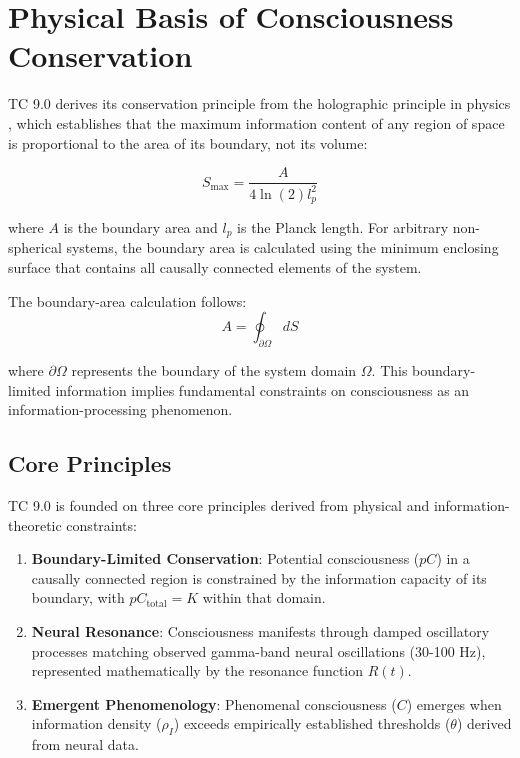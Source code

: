 \documentclass[12pt]{article}
\begin{document}
\section{Physical Basis of Consciousness Conservation}

TC 9.0 derives its conservation principle from the holographic principle in physics \cite{susskind1995,bousso2002}, which establishes that the maximum information content of any region of space is proportional to the area of its boundary, not its volume:

\begin{equation}
S_{\text{max}} = \frac{A}{4\ln(2)l_p^2}
\end{equation}

where $A$ is the boundary area and $l_p$ is the Planck length. For arbitrary non-spherical systems, the boundary area is calculated using the minimum enclosing surface that contains all causally connected elements of the system.

The boundary-area calculation follows:
\begin{equation}
A = \oint_{\partial \Omega} dS
\end{equation}

where $\partial \Omega$ represents the boundary of the system domain $\Omega$. This boundary-limited information implies fundamental constraints on consciousness as an information-processing phenomenon.

\subsection{Core Principles}
TC 9.0 is founded on three core principles derived from physical and information-theoretic constraints:

\begin{enumerate}
    \item \textbf{Boundary-Limited Conservation}: Potential consciousness ($pC$) in a causally connected region is constrained by the information capacity of its boundary, with $pC_{\text{total}} = K$ within that domain.
    
    \item \textbf{Neural Resonance}: Consciousness manifests through damped oscillatory processes matching observed gamma-band neural oscillations (30-100 Hz), represented mathematically by the resonance function $R(t)$.
    
    \item \textbf{Emergent Phenomenology}: Phenomenal consciousness ($C$) emerges when information density ($\rho_I$) exceeds empirically established thresholds ($\theta$) derived from neural data.
\end{enumerate}
\end{document}
